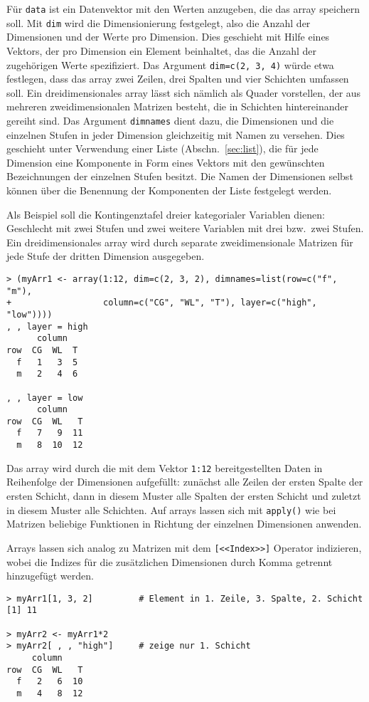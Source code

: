 Für \lstinline!data! ist ein Datenvektor mit den Werten anzugeben, die das array speichern soll. Mit \lstinline!dim! wird die Dimensionierung festgelegt, also die Anzahl der Dimensionen und der Werte pro Dimension. Dies geschieht mit Hilfe eines Vektors, der pro Dimension ein Element beinhaltet, das die Anzahl der zugehörigen Werte spezifiziert. Das Argument \lstinline!dim=c(2, 3, 4)! würde etwa festlegen, dass das array zwei Zeilen, drei Spalten und vier Schichten umfassen soll. Ein dreidimensionales array lässt sich nämlich als Quader vorstellen, der aus mehreren zweidimensionalen Matrizen besteht, die in Schichten hintereinander gereiht sind. Das Argument \lstinline!dimnames! dient dazu, die Dimensionen und die einzelnen Stufen in jeder Dimension gleichzeitig mit Namen zu versehen. Dies geschieht unter Verwendung einer Liste (Abschn.\ \ref{sec:list}), die für jede Dimension eine Komponente in Form eines Vektors mit den gewünschten Bezeichnungen der einzelnen Stufen besitzt. Die Namen der Dimensionen selbst können über die Benennung der Komponenten der Liste festgelegt werden.

Als Beispiel soll die Kontingenztafel dreier kategorialer Variablen dienen: Geschlecht mit zwei Stufen und zwei weitere Variablen mit drei bzw.\ zwei Stufen. Ein dreidimensionales array wird durch separate zweidimensionale Matrizen für jede Stufe der dritten Dimension ausgegeben.
\begin{lstlisting}
> (myArr1 <- array(1:12, dim=c(2, 3, 2), dimnames=list(row=c("f", "m"),
+                  column=c("CG", "WL", "T"), layer=c("high", "low"))))
, , layer = high
      column
row  CG  WL  T
  f   1   3  5
  m   2   4  6

, , layer = low
      column
row  CG  WL   T
  f   7   9  11
  m   8  10  12
\end{lstlisting}

Das array wird durch die mit dem Vektor \lstinline!1:12! bereitgestellten Daten in Reihenfolge der Dimensionen aufgefüllt: zunächst alle Zeilen der ersten Spalte der ersten Schicht, dann in diesem Muster alle Spalten der ersten Schicht und zuletzt in diesem Muster alle Schichten. Auf arrays lassen sich mit \lstinline!apply()! wie bei Matrizen beliebige Funktionen in Richtung der einzelnen Dimensionen anwenden.

Arrays lassen sich analog zu Matrizen mit dem \lstinline![<<Index>>]! Operator indizieren, wobei die Indizes für die zusätzlichen Dimensionen durch Komma getrennt hinzugefügt werden.
\begin{lstlisting}
> myArr1[1, 3, 2]         # Element in 1. Zeile, 3. Spalte, 2. Schicht
[1] 11

> myArr2 <- myArr1*2
> myArr2[ , , "high"]     # zeige nur 1. Schicht
     column
row  CG  WL   T
  f   2   6  10
  m   4   8  12
\end{lstlisting}

